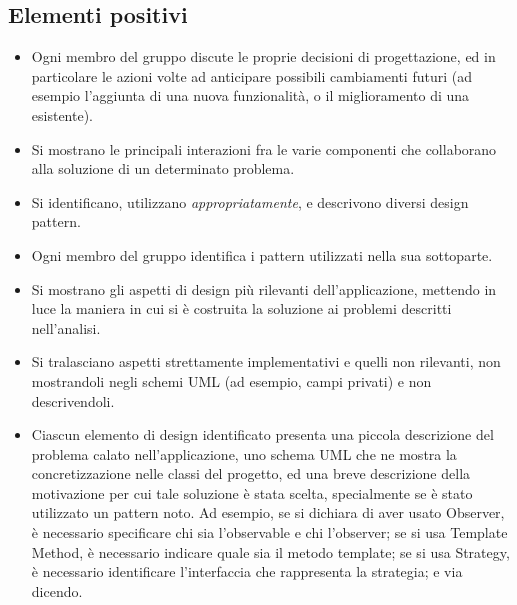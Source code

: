 \documentclass[a4paper,12pt]{report}
\begin{document}
\begin{itemize}
\subsection*{Elementi positivi}

\begin{itemize}
	\item Ogni membro del gruppo discute le proprie decisioni di progettazione, ed in particolare le azioni volte ad anticipare possibili cambiamenti futuri (ad esempio l'aggiunta di una nuova funzionalità, o il miglioramento di una esistente).
	\item Si mostrano le principali interazioni fra le varie componenti che collaborano alla soluzione di un determinato problema.
	\item Si identificano, utilizzano \textit{appropriatamente}, e descrivono diversi design pattern.
	\item Ogni membro del gruppo identifica i pattern utilizzati nella sua sottoparte.
	\item Si mostrano gli aspetti di design più rilevanti dell'applicazione, mettendo in luce la maniera in cui si è costruita la soluzione ai problemi descritti nell'analisi.
	\item Si tralasciano aspetti strettamente implementativi e quelli non rilevanti, non mostrandoli negli schemi UML (ad esempio, campi privati) e non descrivendoli.
	\item Ciascun elemento di design identificato presenta una piccola descrizione del problema calato
nell'applicazione, uno schema UML che ne mostra la concretizzazione nelle classi del progetto, ed
una breve descrizione della motivazione per cui tale soluzione è stata scelta, specialmente se è stato utilizzato un pattern noto. Ad esempio, se si
dichiara di aver usato Observer, è necessario specificare chi sia l'observable e chi l'observer; se
si usa Template Method, è necessario indicare quale sia il metodo template; se si usa Strategy, è
necessario identificare l'interfaccia che rappresenta la strategia; e via dicendo.
\end{itemize}


\end{itemize}
\end{document}
